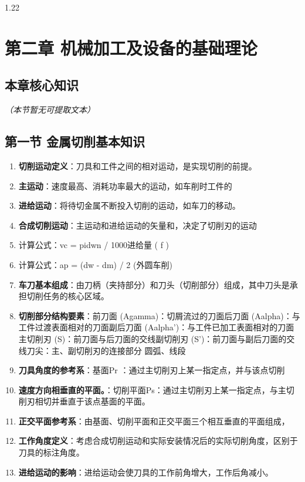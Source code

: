 \documentclass[12pt,a4paper]{article}
\begin{document}
\begin{spacing}{1.22}
\section{第二章 机械加工及设备的基础理论}
\subsection{本章核心知识}
\textit{（本节暂无可提取文本）}

\subsection{第一节 金属切削基本知识}
\begin{tcolorbox}[colback=yellow!6,colframe=red!55!black,title=重点,left=1mm,right=1mm]
\begin{enumerate}[leftmargin=2.2em,label=\arabic*.]
  \item \textbf{切削运动定义}：刀具和工件之间的相对运动，是实现切削的前提。
  \item \textbf{主运动}：速度最高、消耗功率最大的运动，如车削时工件的
  \item \textbf{进给运动}：将待切金属不断投入切削的运动，如车刀的移动。
  \item \textbf{合成切削运动}：主运动和进给运动的矢量和，决定了切削刃的运动
  \item 计算公式：vc = pidwn / 1000进给量 ( f )
  \item 计算公式：ap = (dw - dm) / 2 (外圆车削)
  \item \textbf{车刀基本组成}：由刀柄（夹持部分）和刀头（切削部分）组成，其中刀头是承担切削任务的核心区域。
  \item \textbf{切削部分结构要素}：前刀面 (Agamma)：切屑流过的刀面后刀面 (Aalpha)：与工件过渡表面相对的刀面副后刀面 (Aalpha')：与工件已加工表面相对的刀面主切削刃 (S)：前刀面与后刀面的交线副切削刃 (S')：前刀面与副后刀面的交线刀尖：主、副切削刃的连接部分 圆弧、线段
  \item \textbf{刀具角度的参考系}：基面Pr ：通过主切削刃上某一指定点，并与该点切削
  \item \textbf{速度方向相垂直的平面。}：切削平面Ps：通过主切削刃上某一指定点，与主切削刃相切并垂直于该点基面的平面。
  \item \textbf{正交平面参考系}：由基面、切削平面和正交平面三个相互垂直的平面组成，
  \item \textbf{工作角度定义}：考虑合成切削运动和实际安装情况后的实际切削角度，区别于刀具的标注角度。
  \item \textbf{进给运动的影响}：进给运动会使刀具的工作前角增大，工作后角减小。

\end{enumerate}
\end{tcolorbox}
\end{spacing}
\end{document}
